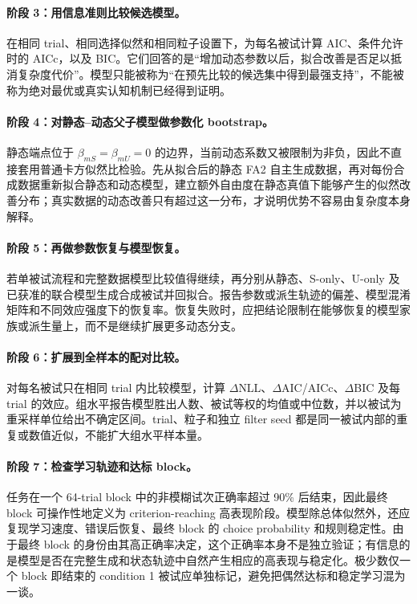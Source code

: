 \paragraph{阶段 3：用信息准则比较候选模型。}
在相同 trial、相同选择似然和相同粒子设置下，为每名被试计算 AIC、条件允许时的 AICc，以及 BIC。它们回答的是“增加动态参数以后，拟合改善是否足以抵消复杂度代价”。模型只能被称为“在预先比较的候选集中得到最强支持”，不能被称为绝对最优或真实认知机制已经得到证明。

\paragraph{阶段 4：对静态--动态父子模型做参数化 bootstrap。}
静态端点位于 $\beta_{mS}=\beta_{mU}=0$ 的边界，当前动态系数又被限制为非负，因此不直接套用普通卡方似然比检验。先从拟合后的静态 FA2 自主生成数据，再对每份合成数据重新拟合静态和动态模型，建立额外自由度在静态真值下能够产生的似然改善分布；真实数据的动态改善只有超过这一分布，才说明优势不容易由复杂度本身解释。

\paragraph{阶段 5：再做参数恢复与模型恢复。}
若单被试流程和完整数据模型比较值得继续，再分别从静态、S-only、U-only 及已获准的联合模型生成合成被试并回拟合。报告参数或派生轨迹的偏差、模型混淆矩阵和不同效应强度下的恢复率。恢复失败时，应把结论限制在能够恢复的模型家族或派生量上，而不是继续扩展更多动态分支。

\paragraph{阶段 6：扩展到全样本的配对比较。}
对每名被试只在相同 trial 内比较模型，计算 $\Delta$NLL、$\Delta$AIC/AICc、$\Delta$BIC 及每 trial 的效应。组水平报告模型胜出人数、被试等权的均值或中位数，并以被试为重采样单位给出不确定区间。trial、粒子和独立 filter seed 都是同一被试内部的重复或数值近似，不能扩大组水平样本量。

\paragraph{阶段 7：检查学习轨迹和达标 block。}
任务在一个 64-trial block 中的非模糊试次正确率超过 90\% 后结束，因此最终 block 可操作性地定义为 criterion-reaching 高表现阶段。模型除总体似然外，还应复现学习速度、错误后恢复、最终 block 的 choice probability 和规则稳定性。由于最终 block 的身份由其高正确率决定，这个正确率本身不是独立验证；有信息的是模型是否在完整生成和状态轨迹中自然产生相应的高表现与稳定化。极少数仅一个 block 即结束的 condition 1 被试应单独标记，避免把偶然达标和稳定学习混为一谈。

